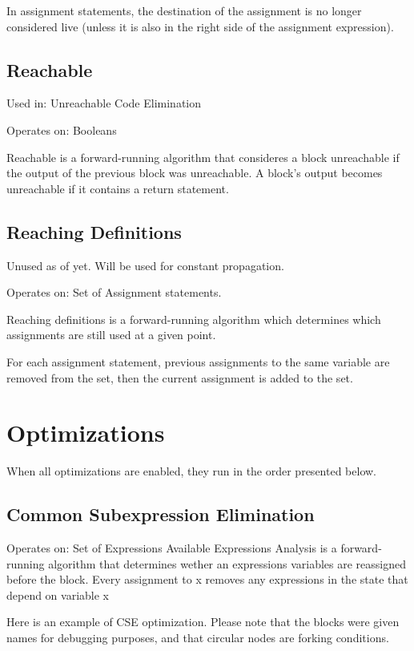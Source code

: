 \documentclass[11pt]{article}
\begin{document}
  In assignment statements, the destination of the assignment is no longer considered live (unless it is
  also in the right side of the assignment expression).

\subsection{Reachable}
\label{sec-2.3}

  Used in: Unreachable Code Elimination

  Operates on: Booleans

  Reachable is a forward-running algorithm that consideres a block unreachable if the output of the previous
  block was unreachable. A block's output becomes unreachable if it contains a return statement.

\subsection{Reaching Definitions}
\label{sec-2.4}

  Unused as of yet. Will be used for constant propagation.

  Operates on: Set of Assignment statements.

  Reaching definitions is a forward-running algorithm which determines which assignments are still used
  at a given point.

  For each assignment statement, previous assignments to the same variable are removed from the set,
  then the current assignment is added to the set.
  
\section{Optimizations}
\label{sec-3}

  When all optimizations are enabled, they run in the order presented below.

\subsection{Common Subexpression Elimination}
\label{sec-3.1}

    Operates on: Set of Expressions
    Available Expressions Analysis is a forward-running algorithm that determines wether an expressions variables are reassigned before the block. 
    Every assignment to x removes any expressions in the state that depend on variable x 
     
  Here is an example of CSE optimization. Please note that the blocks were given names for debugging 
  purposes, and that circular nodes are forking conditions.
\end{document}
